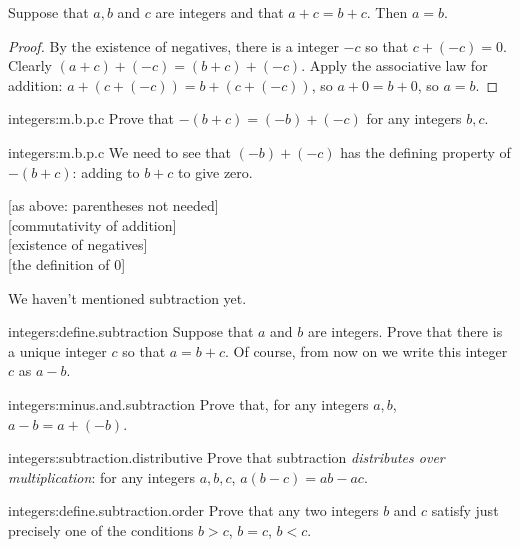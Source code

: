 \begin{theorem}
Suppose that \(a, b\) and \(c\) are integers and that \(a+c=b+c\).
Then \(a=b\).
\end{theorem}
\begin{proof}
By the existence of negatives, there is a integer \(-c\) so that \(c+(-c)=0\).
Clearly \((a+c)+(-c)=(b+c)+(-c)\).
Apply the associative law for addition: \(a+(c+(-c))=b+(c+(-c))\), so \(a+0=b+0\), so \(a=b\). 
\end{proof}

\begin{problem}{integers:m.b.p.c}
Prove that \(-(b+c)=(-b)+(-c)\) for any integers \(b,c\).
\end{problem}
\begin{answer}{integers:m.b.p.c}
We need to see that \((-b)+(-c)\) has the defining property of \(-(b+c)\): adding to \(b+c\) to give zero.
\begin{twocolumnproof}
[as above: parentheses not needed] \\
[commutativity of addition] \\
[existence of negatives] \\
[the definition of \(0\)]
\end{twocolumnproof}
\end{answer}

We haven't mentioned subtraction yet.
\begin{problem}{integers:define.subtraction}
Suppose that \(a\) and \(b\) are integers.
Prove that there is a unique integer \(c\) so that \(a=b+c\).
Of course, from now on we write this integer \(c\) as \(a-b\).
\end{problem}

\begin{problem}{integers:minus.and.subtraction}
Prove that, for any integers \(a,b\), \(a-b=a+(-b)\).
\end{problem}

\begin{problem}{integers:subtraction.distributive}
Prove that subtraction \emph{distributes over multiplication}: for any integers \(a,b,c\), \(a(b-c)=ab-ac\).
\end{problem}

\begin{problem}{integers:define.subtraction.order}
Prove that any two integers \(b\) and \(c\) satisfy just precisely one of the conditions \(b>c\), \(b=c\), \(b<c\).
\end{problem}

